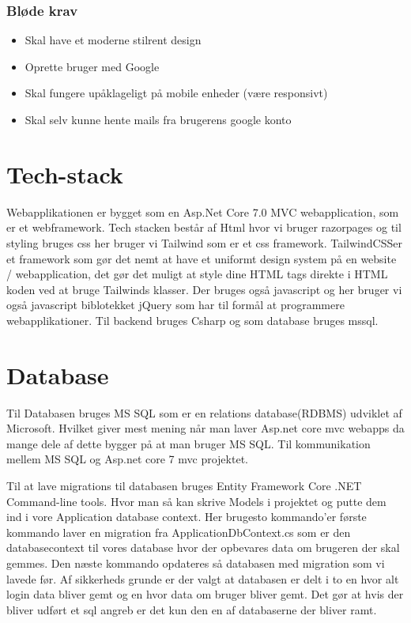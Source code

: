 \subsubsection{Bløde krav}
\begin{itemize}
    \item Skal have et moderne stilrent design
    \item Oprette bruger med Google
    \item Skal fungere upåklageligt på mobile enheder (være responsivt)
    \item Skal selv kunne hente mails fra brugerens google konto
\end{itemize}
\section{Tech-stack}
Webapplikationen er bygget som en Asp.Net Core 7.0 MVC webapplication, som er et webframework. Tech stacken består af Html hvor vi bruger razorpages og til styling bruges css her bruger vi Tailwind som er et
css framework. TailwindCSSer et framework som gør det nemt at have et uniformt design system på en website / webapplication, 
det gør det muligt at style dine HTML tags direkte i HTML koden ved at bruge Tailwinds klasser. Der bruges også javascript 
og her bruger vi også javascript biblotekket jQuery som har til formål
at programmere webapplikationer. Til backend bruges Csharp og som database bruges mssql. 
\section{Database}
Til Databasen bruges MS SQL som er en relations database(RDBMS) udviklet af Microsoft. Hvilket
giver mest mening når man laver Asp.net core mvc webapps da mange dele af dette bygger på at man bruger
MS SQL. Til kommunikation mellem MS SQL og Asp.net core 7 mvc projektet.    

Til at lave migrations til databasen bruges Entity Framework Core .NET Command-line tools. 
Hvor man så kan skrive Models i projektet og putte dem ind i vore Application database 
context. Her brugesto kommando'er første kommando laver en migration fra ApplicationDbContext.cs 
som er den databasecontext til vores database hvor der opbevares data om brugeren der skal gemmes. 
Den næste kommando opdateres så databasen med migration som vi lavede før. Af sikkerheds grunde er der 
valgt at databasen er delt i to en hvor alt login data bliver gemt og en hvor data om bruger bliver gemt.
Det gør at hvis der bliver udført et sql angreb er det kun den en af databaserne der bliver ramt.

